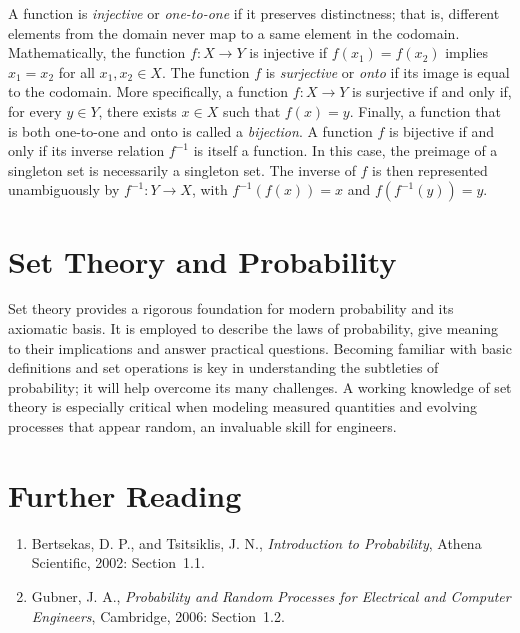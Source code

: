 A function is \emph{injective} or \emph{one-to-one} if it preserves distinctness;
that is, different elements from the domain never map to a same element in the codomain.
Mathematically, the function $f: X \rightarrow Y$ is injective if $f(x_1) = f(x_2)$ implies $x_1 = x_2$ for all $x_1, x_2 \in X$.
The function $f$ is \emph{surjective} or \emph{onto} if its image is equal to the codomain.
More specifically, a function $f: X \rightarrow Y$ is surjective if and only if, for every $y \in Y$, there exists $x \in X$ such that $f(x) = y$.
Finally, a function that is both one-to-one and onto is called a \emph{bijection}.
A function $f$ is bijective if and only if its inverse relation $f^{-1}$ is itself a function.
In this case, the preimage of a singleton set is necessarily a singleton set.
The inverse of $f$ is then represented unambiguously by $f^{-1}: Y \rightarrow X$,
with $f^{-1} (f(x)) = x$ and $f (f^{-1} (y)) = y$.


\section{Set Theory and Probability}

Set theory provides a rigorous foundation for modern probability and its axiomatic basis.
It is employed to describe the laws of probability, give meaning to their implications and answer practical questions.
Becoming familiar with basic definitions and set operations is key in understanding the subtleties of probability; it will help overcome its many challenges.
A working knowledge of set theory is especially critical when modeling measured quantities and evolving processes that appear random, an invaluable skill for engineers.


\section*{Further Reading}

\begin{small}
\begin{enumerate}
\item Bertsekas, D. P., and Tsitsiklis, J. N., \emph{Introduction to Probability}, Athena Scientific, 2002: Section~1.1.
\item Gubner, J. A., \emph{Probability and Random Processes for Electrical and Computer Engineers}, Cambridge, 2006: Section~1.2.
\end{enumerate}
\end{small}

